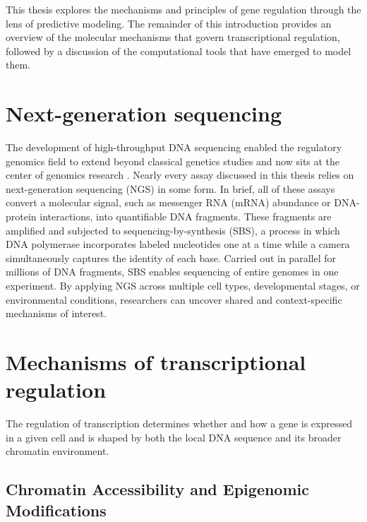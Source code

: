 \begin{dissertationintroduction}
This thesis explores the mechanisms and principles of gene regulation through the lens of predictive modeling. The remainder of this introduction provides an overview of the molecular mechanisms that govern transcriptional regulation, followed by a discussion of the computational tools that have emerged to model them.

\section{Next-generation sequencing}

The development of high-throughput DNA sequencing enabled the regulatory genomics field to extend beyond classical genetics studies and now sits at the center of genomics research \cite{Rodriguez2023-yt}. Nearly every assay discussed in this thesis relies on next-generation sequencing (NGS) in some form. In brief, all of these assays convert a molecular signal, such as messenger RNA (mRNA) abundance or DNA-protein interactions, into quantifiable DNA fragments. These fragments are amplified and subjected to sequencing-by-synthesis (SBS), a process in which DNA polymerase incorporates labeled nucleotides one at a time while a camera simultaneously captures the identity of each base. Carried out in parallel for millions of DNA fragments, SBS enables sequencing of entire genomes in one experiment. By applying NGS across multiple cell types, developmental stages, or environmental conditions, researchers can uncover shared and context-specific mechanisms of interest.

\section{Mechanisms of transcriptional regulation}

The regulation of transcription determines whether and how a gene is expressed in a given cell and is shaped by both the local DNA sequence and its broader chromatin environment.

\subsection{Chromatin Accessibility and Epigenomic Modifications}


\end{dissertationintroduction}
